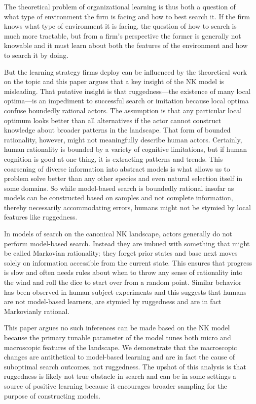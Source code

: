 \documentclass[12pt]{article}
\begin{document}
The theoretical problem of organizational learning is thus both a question of what type of environment the firm is facing and how to best search it. If the firm knows what type of environment it is facing, the question of how to search is much more tractable, but from a firm's perspective the former is generally not knowable and it must learn about both the features of the environment and how to search it by doing.


But the learning strategy firms deploy can be influenced by the theoretical work on the topic and this paper argues that a key insight of the NK model is misleading. That putative insight is that ruggedness---the existence of many local optima---is an impediment to successful search or imitation because local optima confuse boundedly rational actors. The assumption is that any particular local optimum looks better than all alternatives if the actor cannot construct knowledge about broader patterns in the landscape. That form of bounded rationality, however, might not meaningfully describe human actors. Certainly, human rationality is bounded by a variety of cognitive limitations, but if human cognition is good at one thing, it is extracting patterns and trends. This coarsening of diverse information into abstract models is what allows us to problem solve better than any other species and even natural selection itself in some domains. So while model-based search is boundedly rational insofar as models can be constructed based on samples and not complete information, thereby necessarily accommodating errors, humans might not be stymied by local features like ruggedness.

In models of search on the canonical NK landscape, actors generally do not perform model-based search. Instead they are imbued with something that might be called Markovian rationality; they forget prior states and base next moves solely on information accessible from the current state. This ensures that progress is slow and often needs rules about when to throw any sense of rationality into the wind and roll the dice to start over from a random point. Similar behavior has been observed in human subject experiments \cite{Billinger2014, Vuculescu2017} and this suggests that humans are not model-based learners, are stymied by ruggedness and are in fact Markovianly rational.

This paper argues no such inferences can be made based on the NK model because the primary tunable parameter of the model tunes both micro and macroscopic features of the landscape. We demonstrate that the macroscopic changes are antithetical to model-based learning and are in fact the cause of suboptimal search outcomes, not ruggedness. The upshot of this analysis is that ruggedness is likely not true obstacle in search and can be in some settings a source of positive learning because it encourages broader sampling for the purpose of constructing models.
\end{document}
